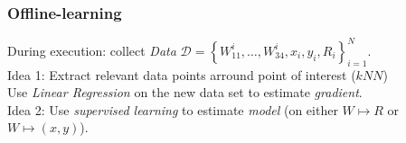 \documentclass{beamer}
\begin{document}
    \begin{frame}
        \frametitle{Offline-learning}
        During execution: collect \textit{Data} ${\mathcal D} = \left\{ W_{11}^i, \dots, W_{34}^i, x_i, y_i, R_i \right\}_{i = 1}^N$.\\
        \vspace{0.5cm}
        Idea 1: Extract relevant data points arround point of interest ($kNN$)\\
        Use \textit{Linear Regression} on the new data set to estimate \textit{gradient}.\\
        \vspace{0.5cm}
        Idea 2: Use \textit{supervised learning} to estimate \textit{model} (on either $W \mapsto R$ or $W \mapsto (x, y)$).\\
    \end{frame}
\end{document}
